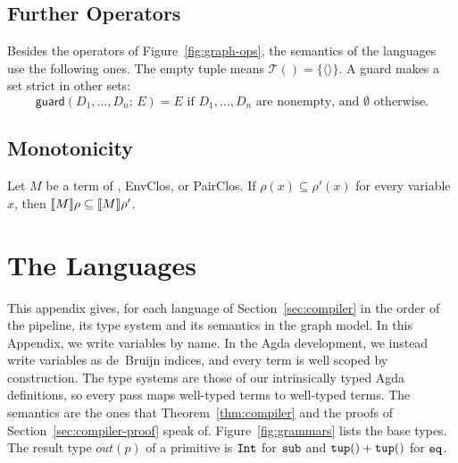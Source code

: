 \subsection{Further Operators}
\label{app:operators}

Besides the operators of Figure~\ref{fig:graph-ops}, the semantics of
the languages use the following ones. The empty tuple means
$\mathcal{T}() = \{\langle\rangle\}$. A guard makes a set strict in other sets:
\[
  \mathsf{guard}(D_1, \ldots, D_n;\, E) = E
  \text{ if } D_1, \ldots, D_n \text{ are nonempty, and } \emptyset \text{ otherwise.}
\]

\subsection{Monotonicity}
\label{app:monotone}

\begin{lemma}[Monotonicity]\label{lem:monotone}
Let $M$ be a term of \fpc, EnvClos, or PairClos. If
$\rho(x) \subseteq \rho'(x)$ for every variable $x$, then
$\llbracket M \rrbracket\rho \subseteq \llbracket M \rrbracket\rho'$.
\end{lemma}

\section{The Languages}
\label{app:languages}
\label{app:types}

This appendix gives, for each language of Section~\ref{sec:compiler} in the
order of the pipeline, its type system and its semantics in the graph model. In
this Appendix, we write variables by name. In the Agda development, we instead
write variables as de~Bruijn indices, and every term is well scoped by
construction. The type systems are those of our intrinsically typed Agda
definitions, so every pass maps well-typed terms to well-typed terms. The
semantics are the ones that Theorem~\ref{thm:compiler} and the proofs of
Section~\ref{sec:compiler-proof} speak of. Figure~\ref{fig:grammars} lists the
base types. The result type $\mathit{out}(p)$ of a primitive is $\mathtt{Int}$ for
$\mathtt{sub}$ and $\mathtt{tup}() + \mathtt{tup}()$ for $\mathtt{eq}$.


